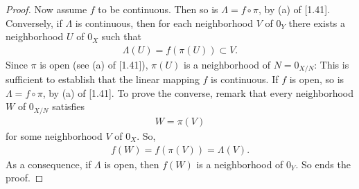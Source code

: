 \begin{proof}
Now assume $f$ to be continuous. Then so is 
%
  $\Lambda = f\circ \pi $, 
% 
by (a) of [1.41]. 
%
Conversely, 
%
if $\Lambda$ is continuous, then for each neighborhood $V$ of $0_Y$ 
there exists a neighborhood $U$ of $0_X$ such that
%
  \begin{align}
    \Lambda(U) = f\left(\pi(U)\right) 
      \subset 
    V.
  \end{align}
%
Since $\pi$ is open (see (a) of [1.41]), $\pi(U)$ is a neighborhood of 
%
  $N=0_{X/N}$: 
This is sufficient to establish that the linear mapping $f$ is continuous.
%
If $f$ is open, so is $\Lambda = f\circ \pi$, by (a) of [1.41]. 
%
To prove the converse, remark that 
%
  every neighborhood $W$ of $0_{X/N}$ satisfies %
%
  \begin{align}
    W = \pi(V)
  \end{align}
%
for some neighborhood $V$ of $0_X$. So, 
%
  \begin{align}
    f(W) = f \left(\pi(V)\right) = \Lambda(V).
  \end{align}
%
As a consequence, 
% 
  if $\Lambda$ is open, then $f(W)$ is a neighborhood of $0_Y$. %
%
So ends the proof.
\end{proof}


